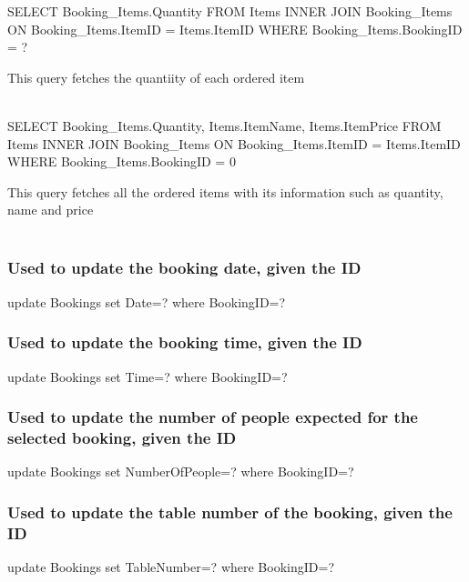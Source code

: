 \begin{sql}
SELECT
 Booking_Items.Quantity
 FROM Items
 INNER JOIN Booking_Items
 ON Booking_Items.ItemID = Items.ItemID
 WHERE Booking_Items.BookingID = ? 
\end{sql}
This query fetches the quantiity of each ordered item \\ \\

\begin{sql}
SELECT
 Booking_Items.Quantity,
 Items.ItemName,
 Items.ItemPrice
 FROM Items
 INNER JOIN Booking_Items
 ON Booking_Items.ItemID = Items.ItemID
 WHERE Booking_Items.BookingID = {0}
\end{sql}
This query fetches all the ordered items with its information such as quantity, name and price \\ \\

\subsubsection{Used to update the booking date, given the ID}
\begin{sql}
update Bookings set Date=? where BookingID=?
\end{sql}

\subsubsection{Used to update the booking time, given the ID}
\begin{sql}
update Bookings set Time=? where BookingID=?
\end{sql}

\subsubsection{Used to update the number of people expected for the selected booking, given the ID}
\begin{sql}
update Bookings set NumberOfPeople=? where BookingID=?
\end{sql}

\subsubsection{Used to update the table number of the booking, given the ID}
\begin{sql}
update Bookings set TableNumber=? where BookingID=?
\end{sql}

